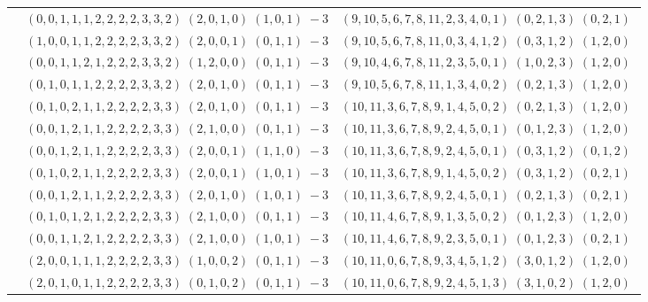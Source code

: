 \documentclass[11pt]{article}
\begin{document}
\begin{longtable}[l]{|c|c|c|}
 \cline{2-3} 
 & $(0 ,0 ,1 ,1 ,1 ,2 ,2 ,2 ,2 ,3 ,3 ,2) \;(2 ,0 ,1 ,0) \;(1 ,0 ,1) \;-3$ & $(9 ,10 ,5 ,6 ,7 ,8 ,11 ,2 ,3 ,4 ,0 ,1) \;(0 ,2 ,1 ,3) \;(0 ,2 ,1) \;$\\ 
 \cline{2-3} 
 & $(1 ,0 ,0 ,1 ,1 ,2 ,2 ,2 ,2 ,3 ,3 ,2) \;(2 ,0 ,0 ,1) \;(0 ,1 ,1) \;-3$ & $(9 ,10 ,5 ,6 ,7 ,8 ,11 ,0 ,3 ,4 ,1 ,2) \;(0 ,3 ,1 ,2) \;(1 ,2 ,0) \;$\\ 
 \cline{2-3} 
 & $(0 ,0 ,1 ,1 ,2 ,1 ,2 ,2 ,2 ,3 ,3 ,2) \;(1 ,2 ,0 ,0) \;(0 ,1 ,1) \;-3$ & $(9 ,10 ,4 ,6 ,7 ,8 ,11 ,2 ,3 ,5 ,0 ,1) \;(1 ,0 ,2 ,3) \;(1 ,2 ,0) \;$\\ 
 \cline{2-3} 
 & $(0 ,1 ,0 ,1 ,1 ,2 ,2 ,2 ,2 ,3 ,3 ,2) \;(2 ,0 ,1 ,0) \;(0 ,1 ,1) \;-3$ & $(9 ,10 ,5 ,6 ,7 ,8 ,11 ,1 ,3 ,4 ,0 ,2) \;(0 ,2 ,1 ,3) \;(1 ,2 ,0) \;$\\ 
 \cline{2-3} 
 & $(0 ,1 ,0 ,2 ,1 ,1 ,2 ,2 ,2 ,2 ,3 ,3) \;(2 ,0 ,1 ,0) \;(0 ,1 ,1) \;-3$ & $(10 ,11 ,3 ,6 ,7 ,8 ,9 ,1 ,4 ,5 ,0 ,2) \;(0 ,2 ,1 ,3) \;(1 ,2 ,0) \;$\\ 
 \cline{2-3} 
 & $(0 ,0 ,1 ,2 ,1 ,1 ,2 ,2 ,2 ,2 ,3 ,3) \;(2 ,1 ,0 ,0) \;(0 ,1 ,1) \;-3$ & $(10 ,11 ,3 ,6 ,7 ,8 ,9 ,2 ,4 ,5 ,0 ,1) \;(0 ,1 ,2 ,3) \;(1 ,2 ,0) \;$\\ 
 \cline{2-3} 
 & $(0 ,0 ,1 ,2 ,1 ,1 ,2 ,2 ,2 ,2 ,3 ,3) \;(2 ,0 ,0 ,1) \;(1 ,1 ,0) \;-3$ & $(10 ,11 ,3 ,6 ,7 ,8 ,9 ,2 ,4 ,5 ,0 ,1) \;(0 ,3 ,1 ,2) \;(0 ,1 ,2) \;$\\ 
 \cline{2-3} 
 & $(0 ,1 ,0 ,2 ,1 ,1 ,2 ,2 ,2 ,2 ,3 ,3) \;(2 ,0 ,0 ,1) \;(1 ,0 ,1) \;-3$ & $(10 ,11 ,3 ,6 ,7 ,8 ,9 ,1 ,4 ,5 ,0 ,2) \;(0 ,3 ,1 ,2) \;(0 ,2 ,1) \;$\\ 
 \cline{2-3} 
 & $(0 ,0 ,1 ,2 ,1 ,1 ,2 ,2 ,2 ,2 ,3 ,3) \;(2 ,0 ,1 ,0) \;(1 ,0 ,1) \;-3$ & $(10 ,11 ,3 ,6 ,7 ,8 ,9 ,2 ,4 ,5 ,0 ,1) \;(0 ,2 ,1 ,3) \;(0 ,2 ,1) \;$\\ 
 \cline{2-3} 
 & $(0 ,1 ,0 ,1 ,2 ,1 ,2 ,2 ,2 ,2 ,3 ,3) \;(2 ,1 ,0 ,0) \;(0 ,1 ,1) \;-3$ & $(10 ,11 ,4 ,6 ,7 ,8 ,9 ,1 ,3 ,5 ,0 ,2) \;(0 ,1 ,2 ,3) \;(1 ,2 ,0) \;$\\ 
 \cline{2-3} 
 & $(0 ,0 ,1 ,1 ,2 ,1 ,2 ,2 ,2 ,2 ,3 ,3) \;(2 ,1 ,0 ,0) \;(1 ,0 ,1) \;-3$ & $(10 ,11 ,4 ,6 ,7 ,8 ,9 ,2 ,3 ,5 ,0 ,1) \;(0 ,1 ,2 ,3) \;(0 ,2 ,1) \;$\\ 
 \cline{2-3} 
 & $(2 ,0 ,0 ,1 ,1 ,1 ,2 ,2 ,2 ,2 ,3 ,3) \;(1 ,0 ,0 ,2) \;(0 ,1 ,1) \;-3$ & $(10 ,11 ,0 ,6 ,7 ,8 ,9 ,3 ,4 ,5 ,1 ,2) \;(3 ,0 ,1 ,2) \;(1 ,2 ,0) \;$\\ 
 \cline{2-3} 
 & $(2 ,0 ,1 ,0 ,1 ,1 ,2 ,2 ,2 ,2 ,3 ,3) \;(0 ,1 ,0 ,2) \;(0 ,1 ,1) \;-3$ & $(10 ,11 ,0 ,6 ,7 ,8 ,9 ,2 ,4 ,5 ,1 ,3) \;(3 ,1 ,0 ,2) \;(1 ,2 ,0) \;$\\ 

\end{longtable}
\end{document}

